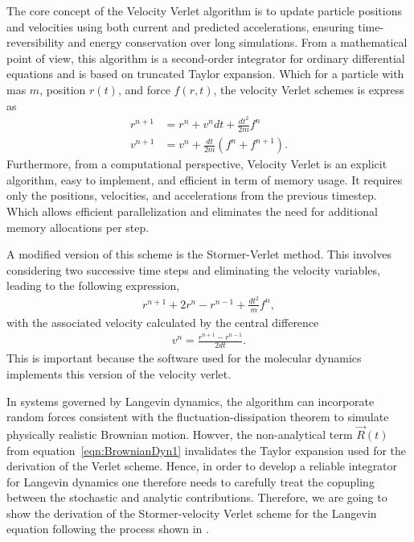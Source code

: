 The core concept of the Velocity Verlet algorithm is to update particle positions and velocities using both current and predicted accelerations, ensuring time-reversibility and energy conservation over long simulations. 
From a mathematical point of view, this algorithm is a second-order integrator for ordinary differential equations and is based on truncated Taylor expansion.
Which for a particle with mas $m$, position $r(t)$, and force $f(r,t)$, the velocity Verlet schemes is express as
\begin{align}
    r^{n+1} &= r^n + v^n dt + \frac{dt^2}{2m}f^n \\
    v^{n+1} &= v^n + \frac{dt}{2m}(f^n+f^{n+1}).
\end{align}
Furthermore, from a computational perspective, Velocity Verlet is an explicit algorithm, easy to implement, and efficient in term of memory usage.
It requires only the positions, velocities, and accelerations from the previous timestep.
Which allows efficient parallelization and eliminates the need for additional memory allocations per step.

A modified version of this scheme is the Stormer-Verlet method. 
This involves considering two successive time steps and eliminating the velocity variables, leading to the following expression,
\begin{align}
    r^{n+1} + 2r^{n} - r^{n-1} + \frac{dt^2}{m}f^{n},
\end{align}
with the associated velocity calculated by the central difference
\begin{align}
    v^n = \frac{r^{n+1} - r^{n-1}}{2dt}.
\end{align}
This is important because the software used for the molecular dynamics implements this version of the velocity verlet.

In systems governed by Langevin dynamics, the algorithm can incorporate random forces consistent with the fluctuation-dissipation theorem to simulate physically realistic Brownian motion.
Howver, the non-analytical term $\vec{R}(t)$ from equation~\eqref{eqn:BrownianDyn1} invalidates the Taylor expansion used for the derivation of the Verlet scheme.
Hence, in order to develop a reliable integrator for Langevin dynamics one therefore needs to carefully treat the copupling between the stochastic and analytic contributions.
Therefore, we are going to show the derivation of the Stormer-velocity Verlet scheme for the Langevin equation following the process shown in \citep{gronbech-jensenSimpleEffectiveVerlettype2013a}.

